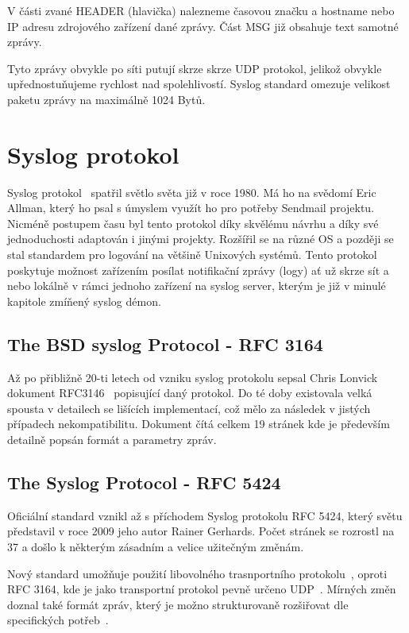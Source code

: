 \documentclass[thesis=B,czech]{FITthesis}[2012/06/26]
\begin{document}
V části zvané HEADER (hlavička) nalezneme časovou značku a hostname nebo IP adresu zdrojového zařízení dané zprávy.
Část MSG již obsahuje text samotné zprávy.

Tyto zprávy obvykle po síti putují skrze skrze UDP protokol, jelikož obvykle upřednostuňujeme rychlost nad spolehlivostí. Syslog standard omezuje velikost paketu zprávy na maximálně 1024 Bytů.

\section{Syslog protokol}
Syslog protokol~\cite{NetworkAdmSurGuide} spatřil světlo světa již v roce 1980. Má ho na svědomí Eric Allman, který ho psal s úmyslem využít ho pro potřeby Sendmail projektu. Nicméně postupem času byl tento protokol díky skvělému návrhu a díky své jednoduchosti adaptován i jinými projekty. Rozšířil se na různé OS a později se stal standardem pro logování na většině Unixových systémů.
Tento protokol poskytuje možnost zařízením posílat notifikační zprávy (logy) ať už skrze sít a nebo lokálně v rámci jednoho zařízení na syslog server, kterým je již v minulé kapitole zmíňený syslog démon.

\subsection{The BSD syslog Protocol - RFC 3164}
Až po přibližně 20-ti letech od vzniku syslog protokolu sepsal Chris Lonvick dokument RFC3146~\cite{RFC3164} popisující daný protokol. Do té doby existovala velká spousta v detailech se lišících implementací, což mělo za následek v jistých případech nekompatibilitu. Dokument čítá celkem 19 stránek kde je především detailně popsán formát a parametry zpráv.

\subsection{The Syslog Protocol - RFC 5424}
Oficiální standard vznikl až s příchodem Syslog protokolu RFC 5424, který světu představil v roce 2009 jeho autor Rainer Gerhards. Počet stránek se rozrostl na 37 a došlo k některým zásadním a velice užitečným změnám.

Nový standard umožňuje použití libovolného trasnportního protokolu~\cite{RFC5424-TrProt}, oproti RFC 3164, kde je jako transportní protokol pevně určeno UDP~\cite{RFC3164-UDP}.
Mírných změn doznal také formát zpráv, který je možno strukturovaně rozšiřovat dle specifických potřeb~\cite{RFC5424-MsgForm}.
\end{document}
